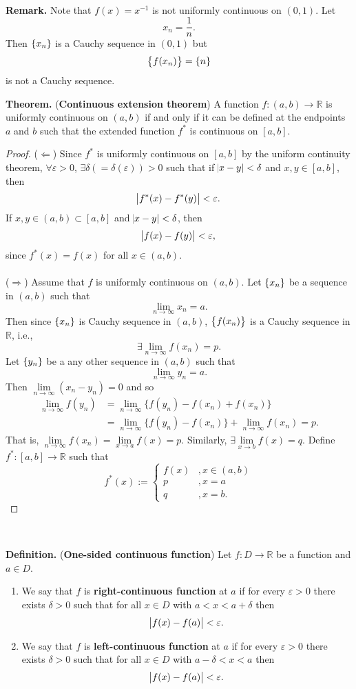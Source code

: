\documentclass[12pt,a4paper]{article}
\begin{document}
\\
\textbf{Remark.} Note that $f(x)=x^{-1}$ is not uniformly continuous on $(0,1)$. Let \[
x_n=\frac{1}{n}.
\] Then $\set{x_n}$ is a Cauchy sequence in $(0,1)$ but \[
\set{f(x_n)}=\set{n}
\] is not a Cauchy sequence.
\\
\begin{tcolorbox}[colback=white]
	\textbf{Theorem.} (\textbf{Continuous extension theorem}) A function $f:(a,b)\to\mathbb{R}$ is uniformly continuous on $(a,b)$ if and only if it can be defined at the endpoints $a$ and $b$ such that the extended function $f^*$ is continuous on $[a,b]$.\tcblower\begin{proof}
		($\Leftarrow$) Since $f^*$ is uniformly continuous on $[a,b]$ by the uniform continuity theorem, $\forall\varepsilon>0$, $\exists\delta(=\delta(\varepsilon))>0$ such that if $\abs{x-y}<\delta$ and $x,y\in[a,b]$, then \[
		\abs{f^*(x)-f^*(y)}<\varepsilon.
		\] If $x,y\in(a,b)\subset[a,b]$ and $\abs{x-y}<\delta$, then \[
		\abs{f(x)-f(y)}<\varepsilon,
		\] since $f^*(x)=f(x)$ for all $x\in(a,b)$. \\
		\\
		($\Rightarrow$) Assume that $f$ is uniformly continuous on $(a,b)$. Let $\set{x_n}$ be a sequence in $(a,b)$ such that \[
		\lim\limits_{n\to\infty}x_n=a.
		\] Then since $\set{x_n}$ is Cauchy sequence in $(a,b)$, $\set{f(x_n)}$ is a Cauchy sequence in $\mathbb{R}$, i.e., \[
		\exists\lim\limits_{n\to\infty}f(x_n)=p.
		\] Let $\set{y_n}$ be a any other sequence in $(a,b)$ such that \[
		\lim\limits_{n\to\infty}y_n=a.
		\] Then $\lim\limits_{n\to\infty}(x_n-y_n)=0$ and so \begin{align*}
		\lim\limits_{n\to\infty}f(y_n) &=\lim\limits_{n\to\infty}\{f(y_n)-f(x_n)+f(x_n)\} \\
		&=\lim\limits_{n\to\infty}\{f(y_n)-f(x_n)\} +\lim\limits_{n\to\infty}f(x_n)=p.
		\end{align*} That is, $\lim\limits_{n\to\infty}f(x_n)=\lim\limits_{x\to a}f(x)=p$. Similarly, $\exists\lim\limits_{x\to b}f(x)=q$. Define $f^*:[a,b]\to\mathbb{R}$ such that \[
		f^*(x):=\begin{cases}
		f(x) &, x\in(a,b) \\ p &, x=a \\ q &, x=b.
		\end{cases}
		\]
	\end{proof}
\end{tcolorbox}
\
\begin{tcolorbox}[colback=white]
	\textbf{Definition.} (\textbf{One-sided continuous function}) Let $f:D\to\mathbb{R}$ be a function and $a\in D$. \begin{enumerate}
		\item We say that $f$ is \textbf{right-continuous function} at $a$ if for every $\varepsilon>0$ there exists $\delta>0$ such that for all $x\in D$ with $a<x<a+\delta$ then \[
		\abs{f(x)-f(a)}<\varepsilon.
		\]
		\item We say that $f$ is \textbf{left-continuous function} at $a$ if for every $\varepsilon>0$ there exists $\delta>0$ such that for all $x\in D$ with $a-\delta<x<a$ then \[
		\abs{f(x)-f(a)}<\varepsilon.
		\]
	\end{enumerate}
\end{tcolorbox}
\end{document}
